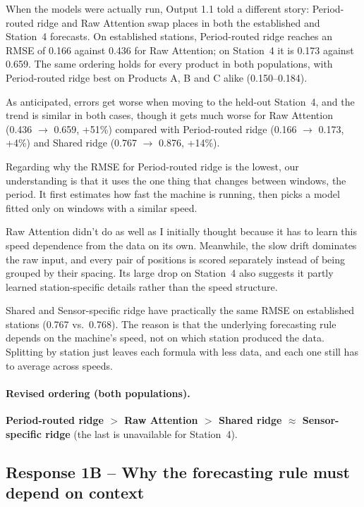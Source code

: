 \documentclass[11pt,a4paper]{article}
\begin{document}
When the models were actually run, Output 1.1 told a different story: Period-routed ridge and Raw Attention swap places in both the established and Station~4 forecasts. On established stations, Period-routed ridge reaches an RMSE of 0.166 against 0.436 for Raw Attention; on Station~4 it is 0.173 against 0.659. The same ordering holds for every product in both populations, with Period-routed ridge best on Products A, B and C alike (0.150--0.184).

As anticipated, errors get worse when moving to the held-out Station~4, and the trend is similar in both cases, though it gets much worse for Raw Attention (0.436 $\to$ 0.659, +51\%) compared with Period-routed ridge (0.166 $\to$ 0.173, +4\%) and Shared ridge (0.767 $\to$ 0.876, +14\%).

Regarding why the RMSE for Period-routed ridge is the lowest, our understanding is that it uses the one thing that changes between windows, the period. It first estimates how fast the machine is running, then picks a model fitted only on windows with a similar speed.

Raw Attention didn't do as well as I initially thought because it has to learn this speed dependence from the data on its own. Meanwhile, the slow drift dominates the raw input, and every pair of positions is scored separately instead of being grouped by their spacing. Its large drop on Station~4 also suggests it partly learned station-specific details rather than the speed structure.

Shared and Sensor-specific ridge have practically the same RMSE on established stations (0.767 vs.\ 0.768). The reason is that the underlying forecasting rule depends on the machine's speed, not on which station produced the data. Splitting by station just leaves each formula with less data, and each one still has to average across speeds.

\paragraph{Revised ordering (both populations).}
\textbf{Period-routed ridge $>$ Raw Attention $>$ Shared ridge $\approx$ Sensor-specific ridge} (the last is unavailable for Station~4).

\subsection*{Response 1B -- Why the forecasting rule must depend on context}
\end{document}
